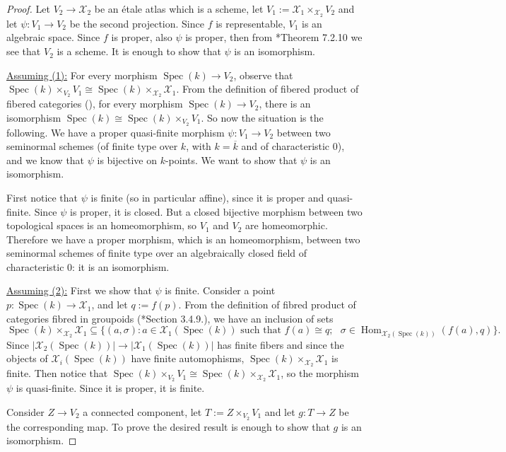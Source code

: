 \documentclass[11pt]{amsart}
\newcommand{\sX}{\mathscr{X}}
\newcommand{\spec}{\operatorname{Spec}}
\theoremstyle{definition}
\begin{document}
\begin{proof}
 Let $V_2 \to \sX_2$ be an \'etale atlas which is a scheme, let $V_1:=\sX_1 \times_{\sX_2}V_2$ and let $\psi:V_1 \to V_2$ be the second projection.
 Since $f$ is representable, $V_1$ is an algebraic space.
 Since $f$ is proper, also $\psi$ is proper, then from \cite{Olsson}*{Theorem 7.2.10} we see that $V_2$ is a scheme.
 It is enough to show that $\psi$ is an isomorphism.
 
  \underline{Assuming (1):} For every morphism $\spec(k) \to V_2$, observe that $\spec(k) \times_{V_2} V_1 \cong \spec(k) \times_{\sX_2}\sX_1$.
  From the definition of fibered product of fibered categories (\cite{Olsson}), for every
 morphism $\spec(k) \to V_2$, there is an isomorphism $\spec(k) \cong \spec(k)\times_{V_2}V_1$.
 So now the situation is the following. We have a proper quasi-finite morphism
 $\psi:V_1 \to V_2$ between two seminormal schemes (of finite type over $k$, with $k=\overline{k}$ and of characteristic 0),
 and we know that $\psi$ is bijective on $k$-points. We want to show that $\psi$ is an isomorphism.
 
 First notice that $\psi$ is finite (so in particular affine), since it is proper and quasi-finite.
 Since $\psi$ is proper, it is closed. But a closed bijective morphism between two topological spaces is an homeomorphism, so
 $V_1$ and $V_2$ are homeomorphic.
 Therefore we have a proper morphism, which is an
 homeomorphism, between two seminormal schemes of finite type over an algebraically closed field of characteristic 0: it is an isomorphism.
 
 \underline{Assuming (2):} First we show that $\psi$ is finite. Consider a point $p:\spec(k)\to \sX_1$, and let $q:=f(p)$. From the definition of fibred product of categories fibred in groupoids (\cite{Olsson}*{Section 3.4.9.}), we have an inclusion of sets 
 $$\spec(k) \times_{\sX_2}\sX_1\subseteq \{(a,\sigma): a \in \sX_1(\spec(k)) \text{ such that }f(a)\cong q; \text{ }\sigma \in \operatorname{Hom}_{\sX_2(\spec(k))}(f(a),q)\}.$$
 Since $|\sX_2(\spec(k))| \to |\sX_1(\spec(k))|$ has finite fibers and since the objects of $\sX_i(\spec(k))$ have finite automophisms, $\spec(k) \times_{\sX_2}\sX_1$ is finite. Then notice that
 $\spec(k)\times_{V_2}V_1 \cong \spec(k) \times_{\sX_2}\sX_1$, so the morphism $\psi$ is quasi-finite. Since it is proper, it is finite.
 
 Consider $Z \to V_2$ a connected component, let $T:=Z \times_{V_2}V_1$ and let $g:T \to Z$ be the corresponding map. To prove the desired result
 is enough to show that $g$ is an isomorphism.
 

\end{proof}
\end{document}
